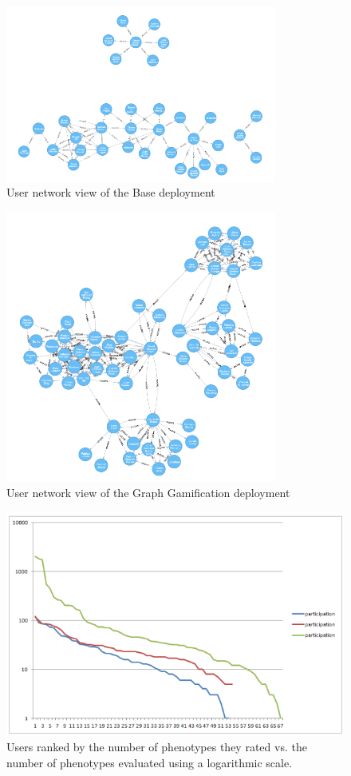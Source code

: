\documentclass[conference]{IEEEtran}
\begin{document}
\begin{figure}[!t]
    \centering
        \includegraphics[width=3.5in]{img/user_known_2.png}
    \caption{User network view of the Base deployment}
    \label{fig:B-network}
\end{figure}
\begin{figure}[!t]
    \centering
        \includegraphics[width=3.5in]{img/user_known_3.png}
    \caption{User network view of the Graph Gamification deployment}
    \label{fig:GG-network}
\end{figure}
\begin{figure}[!t]
    \centering
        \includegraphics[width=5.5in]{img/comparison.png}
    \caption{Users ranked by the number of phenotypes they rated vs. the number of phenotypes evaluated using a logarithmic scale. } %
    \label{fig:top-ranked-participation}
\end{figure}
\end{document}
